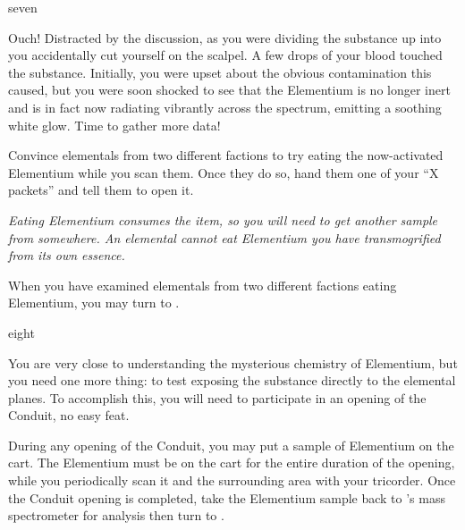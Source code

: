 \documentclass[notebook]{elementals}
\begin{document}
\begin{page}{seven}

Ouch! Distracted by the discussion, as you were dividing the substance up into you accidentally cut yourself on the scalpel. A few drops of your blood touched the substance. Initially, you were upset about the obvious contamination this caused, but you were soon shocked to see that the Elementium is no longer inert and is in fact now radiating vibrantly across the spectrum, emitting a soothing white glow. Time to gather more data!

Convince elementals from two different factions to try eating the now-activated Elementium while you scan them. Once they do so, hand them one of your ``X packets'' and tell them to open it.

\emph{Eating Elementium consumes the item, so you will need to get another sample from somewhere. An elemental cannot eat Elementium you have transmogrified from its own essence.}

When you have examined elementals from two different factions eating Elementium, you may turn to .

\end{page}

\begin{page}{eight}

You are very close to understanding the mysterious chemistry of Elementium, but you need one more thing: to test exposing the substance directly to the elemental planes. To accomplish this, you will need to participate in an opening of the Conduit, no easy feat.

During any opening of the Conduit, you may put a sample of Elementium on the cart. The Elementium must be on the cart for the entire duration of the opening, while you periodically scan it and the surrounding area with your tricorder. Once the Conduit opening is completed, take the Elementium sample back to \cGD{}'s mass spectrometer for analysis then turn to .

\end{page}
\end{document}
